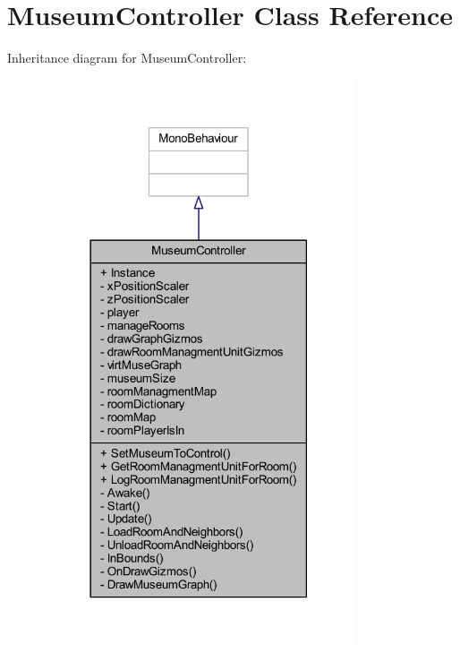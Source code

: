 \hypertarget{class_museum_controller}{}\section{Museum\+Controller Class Reference}
\label{class_museum_controller}


Inheritance diagram for Museum\+Controller\+:
\nopagebreak
\begin{figure}[H]
\begin{center}
\leavevmode
\includegraphics[width=261pt]{class_museum_controller__inherit__graph}
\end{center}
\end{figure}


